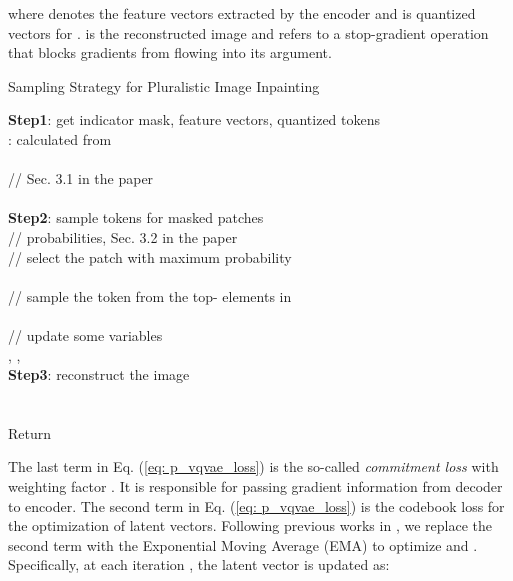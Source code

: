 \documentclass[10pt,twocolumn,letterpaper]{article}
\begin{document}
where   denotes the feature vectors extracted by the encoder and  is quantized vectors for .   is the reconstructed image and  refers to a stop-gradient operation that blocks gradients from flowing into its argument. 





	
\begin{algorithm}[tp]
	\footnotesize
	\caption{Sampling Strategy for Pluralistic Image Inpainting}
	\label{algorithm_sampling_strategy_for_image_inpainting}
	\textbf{Step1}: get indicator mask, feature vectors, quantized tokens \\
    \quad : calculated from   \\
    \quad  \\
    \quad  // Sec. 3.1 in the paper\\
    \\
    
	\textbf{Step2}: sample tokens for masked patches \\
	\quad \While{}
	{
	     // probabilities, Sec. 3.2 in the paper\\ 
	    // select the patch with maximum probability \\
	     \\ 

	    // sample the token from the top- elements in  \\
	     \\
	    
	    // update some variables  \\
	    ,
	    , 
	     \\
	}
	\textbf{Step3}: reconstruct the image\\
    \quad \\
    \quad  \\
	Return 
\end{algorithm}





The last term in Eq. (\ref{eq: p_vqvae_loss}) is the so-called \emph{commitment loss} \cite{van2017neural} with weighting factor . It is responsible for passing gradient information from decoder to encoder.
The second term in Eq. (\ref{eq: p_vqvae_loss}) is the codebook loss for the optimization of latent vectors. Following previous works in \cite{van2017neural,razavi2019generating}, we replace the second term with the Exponential Moving Average (EMA) to optimize  and . Specifically, at each iteration , the latent vector  is updated as:
\end{document}
